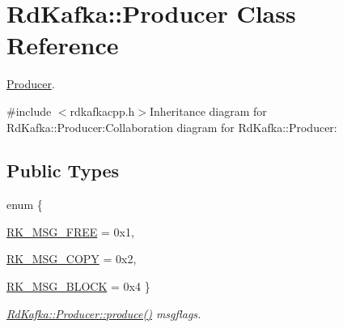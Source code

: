 \hypertarget{classRdKafka_1_1Producer}{
\section{RdKafka::Producer Class Reference}
\label{classRdKafka_1_1Producer}
}


\hyperlink{classRdKafka_1_1Producer}{Producer}.  


{\ttfamily \#include $<$rdkafkacpp.h$>$}Inheritance diagram for RdKafka::Producer:Collaboration diagram for RdKafka::Producer:\subsection*{Public Types}
\begin{DoxyCompactItemize}
\item 
enum \{ \par
\hyperlink{classRdKafka_1_1Producer_abe5e3437f8db2600f10a8daa429ab242a1aaa1620d84d2fa797d05a5bfcefd31e}{RK\_\-MSG\_\-FREE} =  0x1, 
\par
\hyperlink{classRdKafka_1_1Producer_abe5e3437f8db2600f10a8daa429ab242aa88d8865f6dcffe75f73536fdf2424a5}{RK\_\-MSG\_\-COPY} =  0x2, 
\par
\hyperlink{classRdKafka_1_1Producer_abe5e3437f8db2600f10a8daa429ab242a6f05ff968fdf3375508238e192e1c03b}{RK\_\-MSG\_\-BLOCK} =  0x4
 \}
\begin{DoxyCompactList}\small\item\em \hyperlink{classRdKafka_1_1Producer_ab90a30c5e5fb006a3b4004dc4c9a7923}{RdKafka::Producer::produce()} {\ttfamily msgflags}. \item\end{DoxyCompactList}\end{DoxyCompactItemize}
